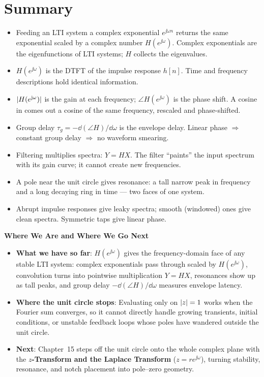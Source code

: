 \section{Summary}
\label{ch14:summary}

\begin{itemize}
  \item Feeding an LTI system a complex exponential $e^{\jj\omega n}$ returns the
  same exponential scaled by a complex number $H(e^{\jj\omega})$. Complex
  exponentials are the eigenfunctions of LTI systems; $H$ collects the
  eigenvalues.
  \item $H(e^{\jj\omega})$ is the DTFT of the impulse response $h[n]$. Time and
  frequency descriptions hold identical information.
  \item $\lvert H(e^{\mathrm{j}\omega})\rvert$ is the gain at each frequency;
  $\angle H(e^{\jj\omega})$ is the phase shift. A cosine in comes out a cosine
  of the same frequency, rescaled and phase-shifted.
  \item Group delay $\tau_g = -\dd(\angle H)/\dd\omega$ is the envelope delay.
  Linear phase $\Rightarrow$ constant group delay $\Rightarrow$ no waveform
  smearing.
  \item Filtering multiplies spectra: $Y = HX$. The filter ``paints'' the input
  spectrum with its gain curve; it cannot create new frequencies.
  \item A pole near the unit circle gives resonance: a tall narrow peak in
  frequency and a long decaying ring in time --- two faces of one system.
  \item Abrupt impulse responses give leaky spectra; smooth (windowed) ones give
  clean spectra. Symmetric taps give linear phase.
\end{itemize}

\begin{connectionbox}
\textbf{Where We Are and Where We Go Next}
\begin{itemize}
  \item \textbf{What we have so far}: $H(e^{\jj\omega})$ gives the frequency-domain face of any
  stable LTI system: complex exponentials pass through scaled by $H(e^{\jj\omega})$, convolution
  turns into pointwise multiplication $Y = HX$, resonances show up as tall peaks, and group delay
  $-\dd(\angle H)/\dd\omega$ measures envelope latency.
  \item \textbf{Where the unit circle stops}: Evaluating only on $\lvert z\rvert = 1$ works when the
  Fourier sum converges, so it cannot directly handle growing transients, initial conditions, or
  unstable feedback loops whose poles have wandered outside the unit circle.
  \item \textbf{Next}: Chapter~15 steps off the unit circle onto the whole complex plane with the
  \textbf{$z$-Transform and the Laplace Transform} ($z = r e^{\jj\omega}$), turning stability,
  resonance, and notch placement into pole--zero geometry.
\end{itemize}
\end{connectionbox}

